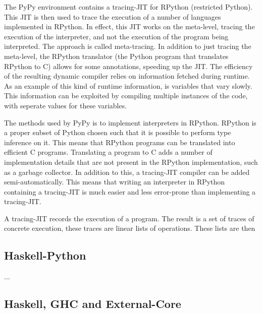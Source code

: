 
The PyPy environment contains a tracing-JIT for RPython (restricted Python). This JIT is
then used to trace the execution of a number of languages implemented in RPython. In effect,
this JIT works on the meta-level, tracing the execution of the interpreter, and not the 
execution of the program being interpreted. The approach is called meta-tracing. In addition
to just tracing the meta-level, the RPython translator (the Python program that translates
RPython to C) allows for some annotations, speeding up the JIT. The efficiency of the 
resulting dynamic compiler relies on information fetched during runtime. As an example of 
this kind of runtime information, is variables that vary slowly. This information can be
exploited by compiling multiple instances of the code, with seperate values for these variables. 
\cite{bolz2011runtime}


The methods used by PyPy is to implement interpreters in RPython. RPython is a proper 
subset of Python chosen such that it is possible to perform type inference on it. This
means that RPython programs can be translated into efficient C programs. Translating a 
program to C adds a number of implementation details that are not present in the RPython
implementation, such as a garbage collector. In addition to this, a tracing-JIT compiler 
can be added semi-automatically. This means that writing an interpreter in RPython containing
a tracing-JIT is much easier and less error-prone than implementing a tracing-JIT. \cite{bolz2011runtime}


A tracing-JIT records the execution of a program. The result is a set of traces of concrete
execution, these traces are linear lists of operations. These lists are then 

\subsection{Haskell-Python}


...


\subsection{Haskell, GHC and External-Core}

